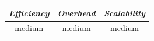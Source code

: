 %
%
%

\begin{center}
\begin{tabular}{ccc}
\emph{Efficiency} & \emph{Overhead} & \emph{Scalability} \\
\hline
medium &
%
medium &
%
medium
\end{tabular}
\end{center}

